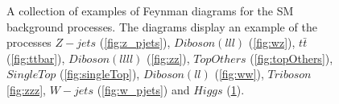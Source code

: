 \begin{figure}
{\begin{subfigure}{.5\textwidth}
            \caption{}
            \label{fig:h}
        \end{subfigure}
    }
    \caption[Feynman diagrams of background processes.]{A collection of examples of Feynman diagrams for the \ac{SM} background processes.
    The diagrams display an example of the processes $Z-jets$ (\ref{fig:z_pjets}), $Diboson(lll)$
    (\ref{fig:wz}), $t\bar{t}$ (\ref{fig:ttbar}), $Diboson(llll)$ (\ref{fig:zz}), $TopOthers$ (\ref{fig:topOthers}),
    $SingleTop$ (\ref{fig:singleTop}), $Diboson(ll)$ (\ref{fig:ww}), $Triboson$ \ref{fig:zzz},
    $W-jets$ (\ref{fig:w_pjets}) and $Higgs$ (\ref{fig:h}).}
    \label{fig:Feynman}
\end{figure}
\newpage
